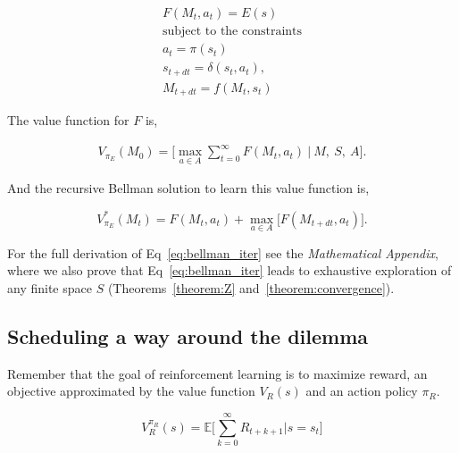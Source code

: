 \documentclass[fleqn,10pt]{wlscirep}
\begin{document}
\begin{equation}
	\begin{split}\label{eq:payout} 
		F(M_{t}, a_t) = E(s)\\
		\text{subject to the constraints} \\
		a_{t} = \pi(s_t) \\
		s_{t+dt} = \delta(s_{t}, a_t),\\
		M_{t+dt} = f(M_{t}, s_{t}) 
	\end{split}
\end{equation}

\noindent The value function for $F$ is,

\begin{equation}\label{eq:V_E} 
	\begin{split}
		V_{\pi_E}(M_0) = \Big [ \max_{a \in A} \sum_{t=0}^{\infty} F(M_t, a_t) \ \Big | \ M,\ S,\ A \Big ]. 
	\end{split}
\end{equation}

\noindent And the recursive Bellman solution to learn this value function is,

\begin{equation}\label{eq:bellman_iter} 
	V^*_{\pi_E}(M_{t}) = F(M_{t}, a_{t}) + \max_{a \in A} \Big [ F(M_{t+dt}, a_t) \Big ].
\end{equation}

For the full derivation of Eq~\ref{eq:bellman_iter} see the \textit{Mathematical Appendix}, where we also prove that Eq~\ref{eq:bellman_iter} leads to exhaustive exploration of any finite space $S$ (Theorems~\ref{theorem:Z} and~\ref{theorem:convergence}).


\subsection*{Scheduling a way around the dilemma} Remember that the goal of reinforcement learning is to maximize reward, an objective approximated by the value function $V_R(s)$ and an action policy $\pi_R$. 

\begin{equation}\label{eq:V_R} 
	V^{\pi_R}_R(s) = \mathbb{E} \Big [ \sum_{k=0}^{\infty} R_{t+k+1} \big | s = s_t \Big ]
\end{equation}
\end{document}
